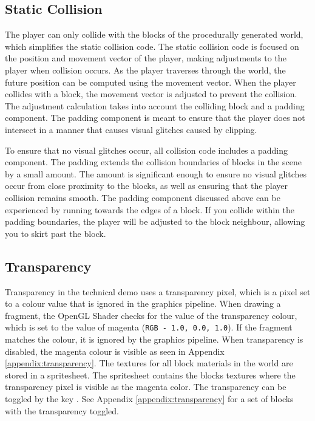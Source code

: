 \documentclass[a4paper,11pt,titlepage]{scrartcl}
\begin{document}
\subsection{Static Collision}
\label{section:collision}
The player can only collide with the blocks of the procedurally generated world, which simplifies the static collision code. The static collision code is focused on the position and movement vector of the player, making adjustments to the player when collision occurs. As the player traverses through the world, the future position can be computed using the movement vector. When the player collides with a block, the movement vector is adjusted to prevent the collision. The adjustment calculation takes into account the colliding block and a padding component. The padding component is meant to ensure that the player does not intersect in a manner that causes visual glitches caused by clipping.

To ensure that no visual glitches occur, all collision code includes a padding component. The padding extends the collision boundaries of blocks in the scene by a small amount. The amount is significant enough to ensure no visual glitches occur from close proximity to the blocks, as well as ensuring that the player collision remains smooth. The padding component discussed above can be experienced by running towards the edges of a block. If you collide within the padding boundaries, the player will be adjusted to the block neighbour, allowing you to skirt past the block.
   
\subsection{Transparency}
\label{section:transparency}
Transparency in the technical demo uses a transparency pixel, which is a pixel set to a colour value that is ignored in the graphics pipeline.  When drawing a fragment, the OpenGL Shader checks for the value of the transparency colour, which is set to the value of magenta (\texttt{RGB - 1.0, 0.0, 1.0}).  If the fragment matches the colour, it is ignored by the graphics pipeline.  When transparency is disabled, the magenta colour is visible as seen in Appendix \ref{appendix:transparency}.  The textures for all block materials in the world are stored in a spritesheet.  The spritesheet contains the blocks textures where the transparency pixel is visible as the magenta color.
\vskip 2.5mm\noindent
The transparency can be toggled by the key .  See Appendix \ref{appendix:transparency} for a set of blocks with the transparency toggled.
    
\end{document}
